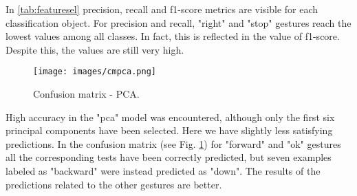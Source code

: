 \noindent In \ref{tab:featuresel} precision, recall and f1-score metrics are visible for each classification object. For precision and recall, "right" and "stop" gestures reach the lowest values among all classes. In fact, this is reflected in the value of f1-score. Despite this, the values are still very high.

\begin{figure}[H]
	\centering
	\texttt{[image: images/cmpca.png]}
	\caption[Confusion matrix - PCA.]{Confusion matrix - PCA.}
	\label{fig:confpca}
\end{figure}

\noindent High accuracy in the "\gls{pca}" model was encountered, although only the first six principal components have been selected. Here we have slightly less satisfying predictions. In the confusion matrix (see Fig. \ref{fig:confpca}) for "forward" and "ok" gestures all the corresponding tests have been correctly predicted, but seven examples labeled as "backward" were instead predicted as "down". The results of the predictions related to the other gestures are better.

